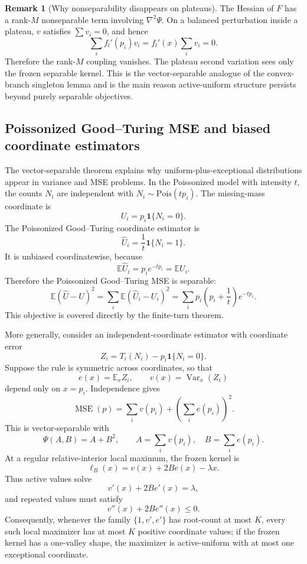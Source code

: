 \documentclass[11pt]{article}
\theoremstyle{definition}
\newtheorem{remark}[theorem]{Remark}
\newcommand{\E}{\mathbb E}
\newcommand{\ones}{\mathbf 1}
\newcommand{\Pois}{\mathrm{Pois}}
\begin{document}
\begin{remark}[Why nonseparability disappears on plateaus]
The Hessian of $F$ has a rank-$M$ nonseparable term involving $\nabla^2\Psi$.  On a balanced perturbation inside a plateau, $v$ satisfies $\sum v_i=0$, and hence
\[
  \sum_i f_l'(p_i)v_i=f_l'(x)\sum_i v_i=0.
\]
Therefore the rank-$M$ coupling vanishes.  The plateau second variation sees only the frozen separable kernel.  This is the vector-separable analogue of the convex-branch singleton lemma and is the main reason active-uniform structure persists beyond purely separable objectives.
\end{remark}

\subsection{Poissonized Good--Turing MSE and biased coordinate estimators}

The vector-separable theorem explains why uniform-plus-exceptional distributions appear in variance and MSE problems.  In the Poissonized model with intensity $t$, the counts $N_i$ are independent with $N_i\sim\Pois(t p_i)$.  The missing-mass coordinate is
\[
  U_i=p_i\ones\{N_i=0\}.
\]
The Poissonized Good--Turing coordinate estimator is
\[
  \widehat U_i=\frac1t\ones\{N_i=1\}.
\]
It is unbiased coordinatewise, because
\[
  \E\widehat U_i=p_i e^{-t p_i}=\E U_i.
\]
Therefore the Poissonized Good--Turing MSE is separable:
\[
  \E(\widehat U-U)^2
  =\sum_i \E(\widehat U_i-U_i)^2
  =\sum_i p_i\left(p_i+\frac1t\right)e^{-t p_i}.
\]
This objective is covered directly by the finite-turn theorem.

More generally, consider an independent-coordinate estimator with coordinate error
\[
  Z_i=T_i(N_i)-p_i\ones\{N_i=0\}.
\]
Suppose the rule is symmetric across coordinates, so that
\[
  e(x)=\E_x Z_i,
  \qquad
  v(x)=\operatorname{Var}_x(Z_i)
\]
depend only on $x=p_i$.  Independence gives
\[
  \operatorname{MSE}(p)
  =\sum_i v(p_i)+\left(\sum_i e(p_i)\right)^2.
\]
This is vector-separable with
\[
  \Psi(A,B)=A+B^2,
  \qquad
  A=\sum_i v(p_i),
  \quad
  B=\sum_i e(p_i).
\]
At a regular relative-interior local maximum, the frozen kernel is
\[
  \ell_B(x)=v(x)+2B e(x)-\lambda x.
\]
Thus active values solve
\[
  v'(x)+2B e'(x)=\lambda,
\]
and repeated values must satisfy
\[
  v''(x)+2B e''(x)\le0.
\]
Consequently, whenever the family $\{1,v',e'\}$ has root-count at most $K$, every such local maximizer has at most $K$ positive coordinate values; if the frozen kernel has a one-valley shape, the maximizer is active-uniform with at most one exceptional coordinate.
\end{document}
